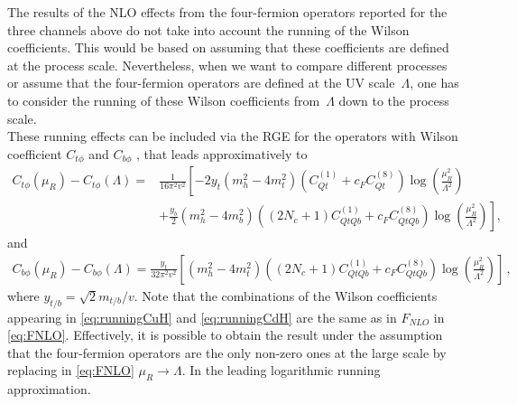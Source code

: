 	\par The results of the NLO effects from the four-fermion operators reported for the three channels above do not take into account the running of the Wilson coefficients. This would be based on assuming that these coefficients are defined at the process scale. Nevertheless, when we want to compare different processes or assume that the four-fermion operators are defined at the UV scale~$\Lambda$, one has to consider the running of these Wilson coefficients from~$\Lambda$ down to the process scale.\\
	These running effects can be included via the RGE for the operators with Wilson coefficient $C_{t\phi}$  and $C_{b\phi}$  \cite{Jenkins:2013zja, Jenkins:2013wua}, that leads approximatively to 
	\begin{equation}
		\begin{split}
			C_{t\phi}(\mu_R)-C_{t\phi}(\Lambda)= &\frac{1}{16 \pi^2 v^2} \left[-2  y_t (m_h^2  -4 m_t^2) (C_{Qt}^{(1)}+c_F C_{Qt}^{(8)} )\log\left( \frac{\mu_R^2}{\Lambda^2}\right) \right.\\
			& \left.+ \frac{y_b}{2} (m_h^2-4 m_b^2)\left(  (2N_c+1)  C_{QtQb}^{(1)}+   c_F C_{QtQb}^{(8)}\right)\log\left( \frac{\mu_R^2}{\Lambda^2}\right)\right], \label{eq:runningCuH}
		\end{split}
	\end{equation}
	and
	\begin{equation}
		\begin{split}
			C_{b\phi}(\mu_R)-C_{b\phi}(\Lambda)= \frac{y_t}{32 \pi^2 v^2} \left[  (m_h^2-4 m_t^2)\left(  (2N_c+1)  C_{QtQb}^{(1)}+   c_F C_{QtQb}^{(8)}\right)\log\left( \frac{\mu_R^2}{\Lambda^2}\right)\right]\,, \label{eq:runningCdH}
		\end{split}
	\end{equation}
	where $y_{t/b}=\sqrt{2} m_{t/b}/v$.
	Note that the combinations of the Wilson coefficients appearing in \eqref{eq:runningCuH} and \eqref{eq:runningCdH} are the same as in $F_{NLO}$ in \eqref{eq:FNLO}.
	Effectively, it is possible to obtain the result under the assumption that the four-fermion operators are the only non-zero ones at the large scale by replacing in \eqref{eq:FNLO} $\mu_R \to \Lambda$. In the leading logarithmic running approximation.


